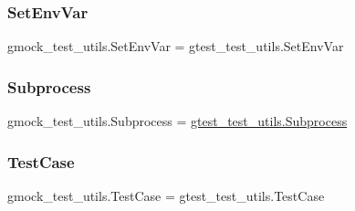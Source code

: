 \subsubsection{\texorpdfstring{SetEnvVar}{SetEnvVar}}
{\footnotesize\ttfamily gmock\+\_\+test\+\_\+utils.\+Set\+Env\+Var = gtest\+\_\+test\+\_\+utils.\+Set\+Env\+Var}

\mbox{\label{namespacegmock__test__utils_a31a0e33565ec805d314cb0a4eb8317e6}} 
\subsubsection{\texorpdfstring{Subprocess}{Subprocess}}
{\footnotesize\ttfamily gmock\+\_\+test\+\_\+utils.\+Subprocess = \mbox{\hyperlink{classgtest__test__utils_1_1_subprocess}{gtest\+\_\+test\+\_\+utils.\+Subprocess}}}

\mbox{\label{namespacegmock__test__utils_a959c5af591e4d49b6d35745205b64509}} 
\subsubsection{\texorpdfstring{TestCase}{TestCase}}
{\footnotesize\ttfamily gmock\+\_\+test\+\_\+utils.\+Test\+Case = gtest\+\_\+test\+\_\+utils.\+Test\+Case}

